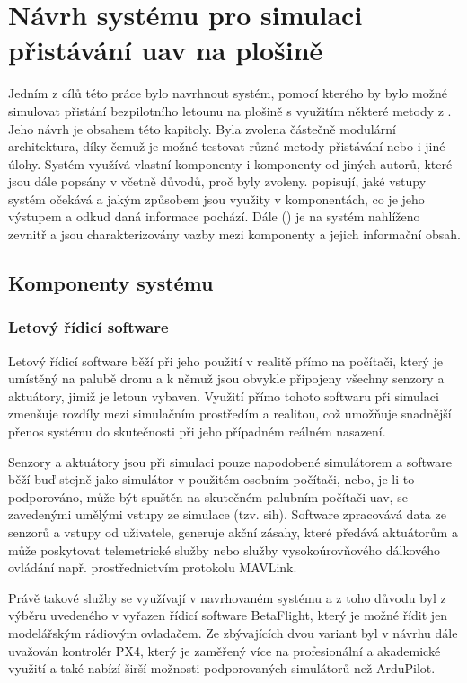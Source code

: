 \chapter{Návrh systému pro simulaci přistávání \acrshort{uav} na plošině} \label{chap:system}
  Jedním z cílů této práce bylo navrhnout systém, pomocí kterého by bylo možné simulovat přistání bezpilotního letounu na plošině s využitím některé metody z . Jeho návrh je obsahem této kapitoly. Byla zvolena částečně modulární architektura, díky čemuž je možné testovat různé metody přistávání nebo i jiné úlohy. Systém využívá vlastní komponenty i komponenty od jiných autorů, které jsou dále popsány v  včetně důvodů, proč byly zvoleny.  popisují, jaké vstupy systém očekává a jakým způsobem jsou využity v komponentách, co je jeho výstupem a odkud daná informace pochází. Dále () je na systém nahlíženo zevnitř a jsou charakterizovány vazby mezi komponenty a jejich informační obsah.
  
  \section{Komponenty systému} \label{sec:components}
    \subsection{Letový řídicí software}
      Letový řídicí software běží při jeho použití v realitě přímo na počítači, který je umístěný na palubě dronu a k němuž jsou obvykle připojeny všechny senzory a aktuátory, jimiž je letoun vybaven. Využití přímo tohoto softwaru při simulaci zmenšuje rozdíly mezi simulačním prostředím a realitou, což umožňuje snadnější přenos systému do skutečnosti při jeho případném reálném nasazení.
      
      Senzory a aktuátory jsou při simulaci pouze napodobené simulátorem a software běží buď stejně jako simulátor v použitém osobním počítači, nebo, je-li to podporováno, může být spuštěn na skutečném palubním počítači \acrshort{uav}, se zavedenými umělými vstupy ze simulace (tzv. \acrfull{sih}). Software zpracovává data ze senzorů a vstupy od uživatele, generuje akční zásahy, které předává aktuátorům a může poskytovat telemetrické služby nebo služby vysokoúrovňového dálkového ovládání např. prostřednictvím protokolu MAVLink.
      
      Právě takové služby se využívají v navrhovaném systému a z toho důvodu byl z výběru uvedeného v  vyřazen řídicí software BetaFlight, který je možné řídit jen modelářským rádiovým ovladačem. Ze zbývajících dvou variant byl v návrhu dále uvažován kontrolér PX4, který je zaměřený více na profesionální a akademické využití a také nabízí širší možnosti podporovaných simulátorů než ArduPilot.
